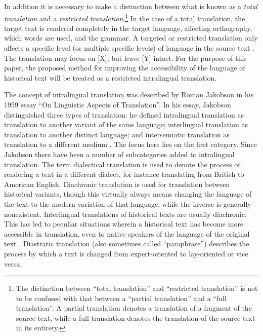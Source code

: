 \begin{paper}
In addition it is necessary to make a distinction between what is known
as a \emph{total translation} and a \emph{restricted
translation}.\footnote{The distinction between ``total translation'' and
  ``restricted translation'' is not to be confused with that between a
  ``partial translation'' and a ``full translation''. A partial
  translation denotes a translation of a fragment of the source text,
  while a full translation denotes the translation of the source text
  in its entirety.} In the case of a total translation, the target text
is rendered completely in the target language, affecting orthography,
which words are used, and the grammar. A targeted or restricted
translation only affects a specific level (or multiple specific levels)
of language in the source text \citep[22]{catford_linguistic_1965}. The
translation may focus on {[}X{]}, but leave {[}Y{]} intact. For the
purpose of this paper, the proposed method for improving the
accessibility of the language of historical text will be treated as a
restricted intralingual translation.

The concept of intralingual translation was described by Roman Jakobson
in his 1959 essay ``On Linguistic Aspects of Translation''. In his essay,
Jakobson distinguished three types of translation: he defined
intralingual translation as translation to another variant of the same
language; interlingual translation as translation to another distinct
language; and intersemiotic translation as translation to a different
medium \citep[233--34]{jakobson_linguistic_1959}. The focus here lies on the first
category. Since Jakobson there have been a number of subcategories added
to intralingual translation. The term dialectical translation is used to
denote the process of rendering a text in a different dialect, for
instance translating from British to American English. Diachronic
translation is used for translation between historical variants, though
this virtually always means changing the language of the text to the
modern variation of that language, while the inverse is generally
nonexistent. Interlingual translations of historical texts are usually
diachronic. This has led to peculiar situations wherein a historical
text has become more accessible in translation, even to native speakers
of the language of the original text \citep[71]{hill-madsen_derivation_2014}. Diastratic
translation (also sometimes called ``paraphrase'') describes the process
by which a text is changed from expert-oriented to lay-oriented or vice
versa.


\end{paper}
